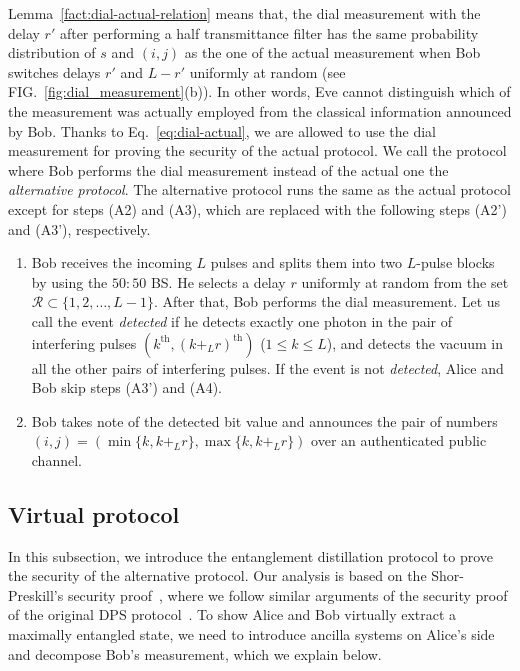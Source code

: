 \documentclass[twocolumn,superscriptaddress,pra,footinbib,notitlepage]{revtex4-1}
\newcommand{\1}{\mbox{1}\hspace{-0.25em}\mbox{l}}
\begin{document}
Lemma~\ref{fact:dial-actual-relation} means that, the dial measurement with the delay $r'$ after performing a half transmittance filter has the same probability distribution of $s$ and $(i,j)$ as the one of the actual measurement when Bob switches delays $r'$ and $L-r'$ uniformly at random (see FIG.~\ref{fig:dial_measurement}(b)). In other words, Eve cannot distinguish which of the measurement was actually employed from the classical information announced by Bob. Thanks to Eq.~\eqref{eq:dial-actual}, we are allowed to use the dial measurement for proving the security of the actual protocol.
We call the protocol where Bob performs the dial measurement instead of the actual one the \textit{alternative protocol}. The alternative protocol runs the same as the actual protocol except for steps (A2) and (A3), which are replaced with the following steps (A2') and (A3'), respectively.
\begin{enumerate}[label=(A\arabic*')]
\setlength{\parskip}{0cm}
\setlength{\itemsep}{0cm}
\setcounter{enumi}{1}
\item Bob receives the incoming $L$ pulses and splits them into two $L$-pulse blocks by using the $50:50$ BS.
He selects a delay $r$ uniformly at random from the set $\mathcal{R}\subset\{1, 2, \dots, L-1\}$. After that, Bob performs the dial measurement. Let us call the event \textit{detected} if he detects exactly one photon in the pair of interfering pulses $(k^\textrm{th}, (k+_Lr)^\textrm{th})$ ($1\leq k\leq L$), and detects the vacuum in all the other pairs of interfering pulses. If the event is not \textit{detected}, Alice and Bob skip steps (A3') and (A4).
\item Bob takes note of the detected bit value and announces the pair of numbers $(i, j)=(\min\{k, k+_Lr\}, \max\{k, k+_Lr\})$ over an authenticated public channel.
\end{enumerate}

\subsection{Virtual protocol}
\label{subsec:virtual-protocol}
In this subsection, we introduce the entanglement distillation protocol to prove the security of the alternative protocol. Our analysis is based on the Shor-Preskill's security proof~\cite{shor2000simple}, where we follow similar arguments of the security proof of the original DPS protocol~\cite{tamaki2012unconditional}.
To show Alice and Bob virtually extract a maximally entangled state, we need to introduce ancilla systems on Alice's side and decompose Bob's measurement, which we explain below. 
\end{document}

